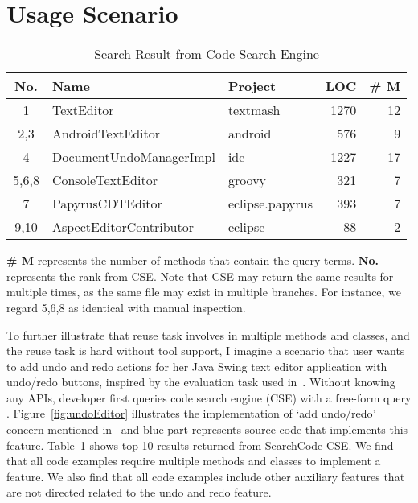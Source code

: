 
\section{Usage Scenario}

\begin{table}[ht]
\begin{center}
\caption{Search Result from Code Search Engine}
\label{tab:total}
\scriptsize{
\begin{tabular*}{0.5\textwidth}{@{}c|llrr@{}} \hline
No.&Name&Project&LOC&\# M\\\hline
1&TextEditor&textmash&1270&12\\
2,3&AndroidTextEditor&android&576&9\\
4&DocumentUndoManagerImpl&ide&1227&17\\
5,6,8&ConsoleTextEditor&groovy&321&7\\ 
7&PapyrusCDTEditor&eclipse.papyrus&393&7\\
9,10&AspectEditorContributor&eclipse&88&2\\ \hline
\end{tabular*}
 \label{tab:undoResult}
 \textbf{ \# M} represents the number of methods that contain the query terms. 
 {\bf No.} represents the rank from CSE. Note that CSE may return the same results for multiple times, as the same file may exist in multiple branches. For instance, we regard 5,6,8 as identical with manual inspection. 
 
}
 \end{center}
\end{table}

To further illustrate that reuse task involves in multiple methods and classes, and the reuse task is hard without tool support, I imagine a scenario that user wants to add undo and redo actions for her Java Swing text editor application with undo/redo buttons, inspired by the evaluation task used in~\cite{Murphy:nlConcern11}. Without knowing any APIs, developer  first queries code search engine (CSE) with a free-form query . Figure~\ref{fig:undoEditor} illustrates the implementation of `add undo/redo' concern mentioned in~\cite{Murphy:nlConcern11} and blue part represents source code that implements this feature.  Table~\ref{tab:undoResult} shows top 10 results returned from SearchCode CSE. We find that all code examples require multiple methods and classes to implement a feature. We also find that all code examples include other auxiliary features that are not directed related to the undo and redo feature. 

